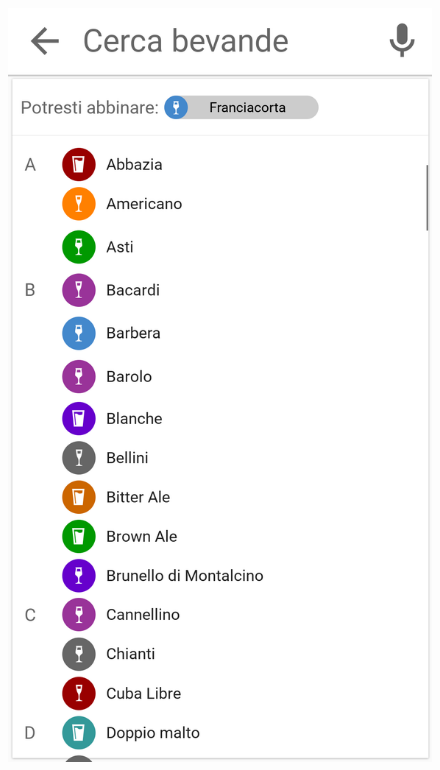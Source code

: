 \begin{figure}[H]
\begin{minipage}{.49\textwidth}
		\includegraphics[width=\textwidth]{img/wireframe/aggiungi_bevanda_consiglio.png}
	\end{minipage}
\end{figure}
